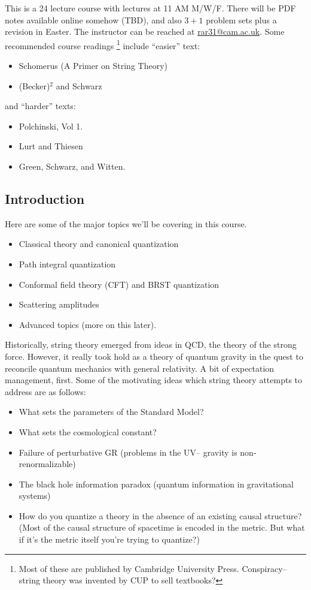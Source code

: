 \begin{note}
    This is a 24 lecture course with lectures at 11 AM M/W/F. There will be PDF notes available online somehow (TBD), and also $3+1$ problem sets plus a revision in Easter. The instructor can be reached at \url{rar31@cam.ac.uk}. Some recommended course readings%
        \footnote{Most of these are published by Cambridge University Press. Conspiracy-- string theory was invented by CUP to sell textbooks?
        }
    include ``easier'' text:
    \begin{itemize}
        \item Schomerus (A Primer on String Theory)
        \item (Becker)${}^2$ and Schwarz
    \end{itemize}
    and ``harder'' texts:
    \begin{itemize}
        \item Polchinski, Vol 1.
        \item Lurt and Thiesen
        \item Green, Schwarz, and Witten.
    \end{itemize}
\end{note}

\subsection*{Introduction} Here are some of the major topics we'll be covering in this course.
\begin{itemize}
    \item Classical theory and canonical quantization
    \item Path integral quantization
    \item Conformal field theory (CFT) and BRST quantization
    \item Scattering amplitudes
    \item Advanced topics (more on this later).
\end{itemize}

Historically, string theory emerged from ideas in QCD, the theory of the strong force. However, it really took hold as a theory of quantum gravity in the quest to reconcile quantum mechanics with general relativity. A bit of expectation management, first. Some of the motivating ideas which string theory attempts to address are as follows:
\begin{itemize}
    \item What sets the parameters of the Standard Model?
    \item What sets the cosmological constant?
    \item Failure of perturbative GR (problems in the UV-- gravity is non-renormalizable)
    \item The black hole information paradox (quantum information in gravitational systems)
    \item How do you quantize a theory in the absence of an existing causal structure? (Most of the causal structure of spacetime is encoded in the metric. But what if it's the metric itself you're trying to quantize?)
\end{itemize}

